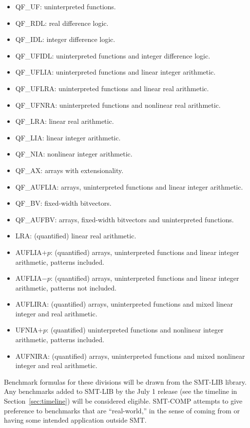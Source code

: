 \documentclass[12pt]{article}
\begin{document}
\begin{itemize}
\item QF\_UF: uninterpreted functions.
\item QF\_RDL: real difference logic.
\item QF\_IDL: integer difference logic.
\item QF\_UFIDL: uninterpreted functions and integer difference logic.
\item QF\_UFLIA: uninterpreted functions and linear integer arithmetic.
\item QF\_UFLRA: uninterpreted functions and linear real arithmetic.
\item QF\_UFNRA: uninterpreted functions and nonlinear real arithmetic.
\item QF\_LRA: linear real arithmetic.
\item QF\_LIA: linear integer arithmetic.
\item QF\_NIA: nonlinear integer arithmetic.
\item QF\_AX: arrays with extensionality.
\item QF\_AUFLIA: arrays, uninterpreted functions and linear integer 
                  arithmetic.
\item QF\_BV: fixed-width bitvectors.
\item QF\_AUFBV: arrays, fixed-width bitvectors and uninterpreted
functions.
\item LRA: (quantified) linear real arithmetic.
\item AUFLIA$+p$: (quantified) arrays, uninterpreted functions and 
linear integer arithmetic, patterns included.
\item AUFLIA$-p$: (quantified) arrays, uninterpreted functions and 
linear integer arithmetic, patterns not included.
\item AUFLIRA: (quantified) arrays, uninterpreted functions and 
mixed linear integer and real arithmetic.
\item UFNIA$+p$: (quantified) uninterpreted functions and 
nonlinear integer arithmetic, patterns included.
\item AUFNIRA: (quantified) arrays, uninterpreted functions and 
mixed nonlinear integer and real arithmetic.
\end{itemize}

Benchmark formulas for these divisions
will be drawn from the SMT-LIB library.  Any benchmarks added to
SMT-LIB by the July 1 release (see the timeline in
Section~\ref{sec:timeline}) will be considered eligible.  SMT-COMP
attempts to give preference to benchmarks that are ``real-world,'' in
the sense of coming from or having some intended application outside
SMT.
\end{document}
